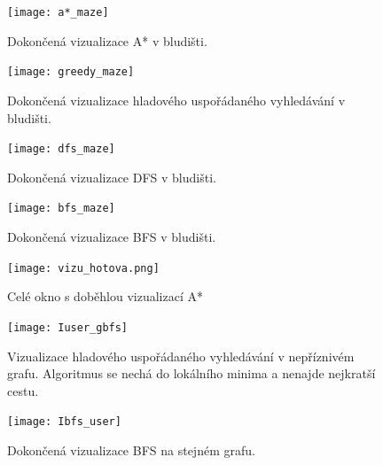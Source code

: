 \documentclass[12pt]{report}			%
\begin{document}
			\begin{figure}[h]
\begin{minipage}[outer sep=0]{\textwidth}
\begin{minipage}[t]{0.48\textwidth}
			
  			\texttt{[image: a*\_maze]}\caption{Dokončená vizualizace A* v bludišti.}\label{a*_maze}
			
    \end{minipage}\hfill
    \begin{minipage}[t]{0.48\textwidth}
\texttt{[image: greedy\_maze]}\caption{Dokončená vizualizace hladového uspořádaného vyhledávání v bludišti.}\label{greedy_maze}
    \end{minipage}
    \end{minipage}\vspace{1ex}
\end{figure}


\begin{figure}[h]
\begin{minipage}[outer sep=0]{\textwidth}
\begin{minipage}[c]{0.48\textwidth}
			
  			\texttt{[image: dfs\_maze]}\caption{Dokončená vizualizace DFS v bludišti.}\label{DFS_maze}
			
    \end{minipage}\hfill
    \begin{minipage}[c]{0.48\textwidth}
\texttt{[image: bfs\_maze]}\caption{Dokončená vizualizace BFS v bludišti.}\label{BFS_maze}
    \end{minipage}
    \end{minipage}\vspace{1ex}
\end{figure}


  			
			\begin{figure}
  			\centering 
  			\texttt{[image: vizu\_hotova.png]}
  			\caption{Celé okno s doběhlou vizualizací A*}
  			\label{vizu1}
  			\end{figure}
  			
  			
\begin{figure}[h]
\begin{minipage}[outer sep=0]{\textwidth}
\begin{minipage}[t]{0.48\textwidth}
			
  			\texttt{[image: Iuser\_gbfs]}\caption{Vizualizace hladového uspořádaného vyhledávání v nepříznivém grafu. Algoritmus se nechá  do lokálního minima a nenajde nejkratší cestu.}\label{gbfs_user}
			
    \end{minipage}\hfill
    \begin{minipage}[t]{0.48\textwidth}
\texttt{[image: Ibfs\_user]}\caption{Dokončená vizualizace BFS na stejném grafu.}\label{bfs_user}
    \end{minipage}
    \end{minipage}\vspace{1ex}
\end{figure}
\end{document}
